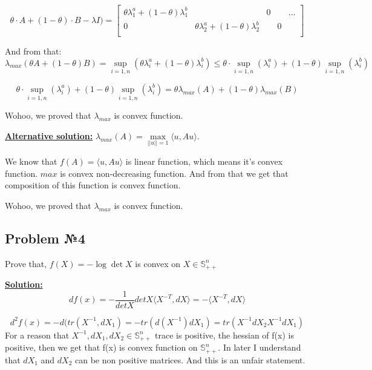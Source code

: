 \begin{equation*}
    \theta \cdot A + (1-\theta) \cdot B - \lambda I) = \begin{bmatrix}
    \theta \lambda_1^a + (1-\theta) \lambda_1^b  && 0 && ... \\
    0 & \theta \lambda_2^a + (1-\theta) \lambda_2^b && 0 \\
    \end{bmatrix}
\end{equation*}

And from that:
\begin{equation*}
    \lambda_{max}(\theta A + (1-\theta)B) = \sup\limits_{i = 1, n} ( \theta \lambda_i^a + (1-\theta) \lambda_i^b) \leq \theta \cdot \sup\limits_{i = 1, n}(\lambda_{i}^a) + (1-\theta)\sup\limits_{i = 1, n}(\lambda_i^b)
\end{equation*}

\begin{equation*}
    \theta \cdot \sup\limits_{i = 1, n}(\lambda_{i}^a) + (1-\theta)\sup\limits_{i = 1, n}(\lambda_i^b) = \theta \lambda_{max}(A) + (1-\theta)\lambda_{max}(B)
\end{equation*}

Wohoo, we proved that $\lambda_{max}$ is convex function.

\underline{\textbf{Alternative solution:}}
$\lambda_{max}(A) = \max\limits_{||u|| = 1} \langle u, Au \rangle$. 

We know that $f(A) = \langle u, Au \rangle$ is linear function, which means it's convex function. $max$ is convex non-decreasing function. And from that we get that composition of this function is convex function.

Wohoo, we proved that $\lambda_{max}$ is convex function.

\subsection{Problem №4}
Prove that, $f(X) = - \log \det X$ is convex on $X \in \mathds{S}_{++}^n$

\underline{\textbf{Solution:}}
\begin{equation*}
df(x) = - \frac{1}{detX} detX \langle X^{-T}, dX \rangle = - \langle X^{-T}, dX \rangle
\end{equation*}

\begin{equation*}
    d^2f(x) = -d(tr(X^{-1}, dX_1) = -tr(d(X^{-1})dX_1) = tr(X^{-1}dX_2X^{-1}dX_1)
\end{equation*}
For a reason that $X^{-1}, dX_1, dX_2 \in \mathds{S}_{++}^n$ trace is positive, the hessian of f(x) is positive, then we get that f(x) is convex function on $\mathds{S}_{++}^n$. 
In later I understand that $dX_1$ and $dX_2$ can be non positive matrices. And this is an unfair statement.

